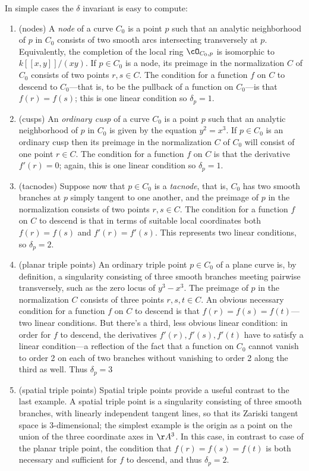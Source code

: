 In simple cases the $\delta$ invariant is easy to compute:


\begin{enumerate}

\item (nodes) A \emph{node} of a curve $C_0$ is a point $p$ such that an analytic neighborhood of $p$ in $C_0$ consists of two smooth arcs intersecting transversely at $p$. Equivalently, the completion of the local ring $\cO_{C_0,p}$ is isomorphic to $k[[x,y]]/(xy)$. If $p \in C_0$ is a node, its preimage in the normalization $C$ of $C_0$ consists of two points $r,s\in C$. The condition for a function $f$ on $C$ to descend to $C_0$---that is, to be the pullback of a function
on $C_0$---is  that $f(r)=f(s)$; this is one linear condition so $\delta_p = 1$.

\item (cusps) An \emph{ordinary cusp} of a curve $C_0$ is a point $p$ such that an analytic neighborhood of $p$ in $C_0$ is given by the equation $y^2=x^3$. If $p \in C_0$ is an ordinary cusp then its preimage in the normalization $C$ of $C_0$ will consist of one point $r\in C$. The condition for a function $f$ on $C$  is that the derivative $f'(r)=0$; again, this is one linear condition so $\delta_p = 1$.

\item (tacnodes) Suppose now that $p \in C_0$ is a \emph{tacnode}, that is, $C_0$ has two smooth branches at $p$ simply tangent to one another, and the preimage of $p$ in the normalization consists of two points $r,s\in C$. The condition for a function $f$ on $C$ to descend is that in terms of suitable local coordinates both $f(r)=f(s)$ and $f'(r)=f'(s)$.  This represents two linear conditions, so $\delta_p = 2$.

\item (planar triple points) An ordinary triple point $p \in C_0$ of a plane curve is, by definition, a singularity consisting of three smooth branches meeting pairwise transversely, such as the zero locus of $y^3-x^3$. 
The preimage of $p$ in the normalization $C$ consists of three points $r,s,t \in C$. An obvious necessary condition for a function $f$ on $C$ to descend is that $f(r)=f(s)=f(t)$---two linear conditions. But there's a third, less obvious linear condition: in order for $f$ to descend, the derivatives $f'(r), f'(s), f'(t)$ have to satisfy a linear condition---a reflection of the fact that a function on $C_0$ cannot vanish to order 2 on each of two branches without vanishing to order 2 along the third as well. Thus $\delta_p = 3$

\item (spatial triple points) Spatial triple points provide a useful contrast to the last example. A spatial triple point is a singularity consisting of three smooth branches, with linearly independent tangent lines, so that its Zariski tangent space is 3-dimensional; the simplest example is the origin as a point on the union of the three coordinate axes in $\AA^3$.
In this case, in contrast to case of the planar triple point, the condition that $f(r)=f(s)=f(t)$ is both necessary and sufficient for $f$ to descend, and thus  $\delta_p=2$.

\end{enumerate}

